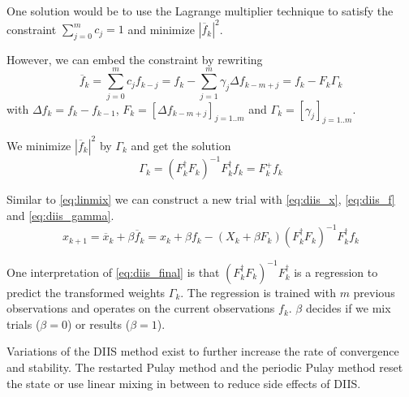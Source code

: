 One solution would be to use the Lagrange multiplier technique to satisfy the constraint \(\sum_{j=0}^{m} c_j = 1\) and minimize \(|\overline{f}_{k}|^2\).\cite{diis_math}

However, we can embed the constraint by rewriting \footnotemark
\begin{equation} \label{eq:diis_f}
\overline{f}_{k} = \sum_{j=0}^{m} c_j f_{k-j} = f_k - \sum_{j=1}^{m} \gamma_j {\Delta f}_{k-m+j} = f_k - F_k \Gamma_k
\end{equation}
with \({\Delta f}_{k} = f_k - f_{k-1}\), \(F_k = [{\Delta f}_{k-m+j}]_{j=1..m}\) and \(\Gamma_k = [\gamma_j]_{j=1..m}\).


We minimize \(|\overline{f}_{k}|^2\) by \(\Gamma_k\) and get the solution \footnotemark
\begin{equation} \label{eq:diis_gamma}
\Gamma_k = (F_k^\dagger F_k)^{-1} F_k^\dagger f_k = F_k^+ f_k
\end{equation}


Similar to \eqref{eq:linmix} we can construct a new trial with \eqref{eq:diis_x}, \eqref{eq:diis_f} and \eqref{eq:diis_gamma}.
\begin{equation} \label{eq:diis_final}
x_{k+1} = \overline{x}_k + \beta \overline{f}_k = x_k + \beta f_k - (X_k + \beta F_k) (F_k^\dagger F_k)^{-1} F_k^\dagger f_k
\end{equation}

One interpretation of \eqref{eq:diis_final} is that \((F_k^\dagger F_k)^{-1} F_k^\dagger\) is a regression to predict the transformed weights $\Gamma_k$. The regression is trained with \(m\) previous observations and operates on the current observations \(f_k\). $\beta$ decides if we mix trials (\(\beta = 0\)) or results (\(\beta = 1\)).

Variations of the DIIS method exist to further increase the rate of convergence and stability. The restarted Pulay method\cite{diis_restarted} and the periodic Pulay method\cite{diis_periodic} reset the state or use linear mixing in between to reduce side effects of DIIS.

